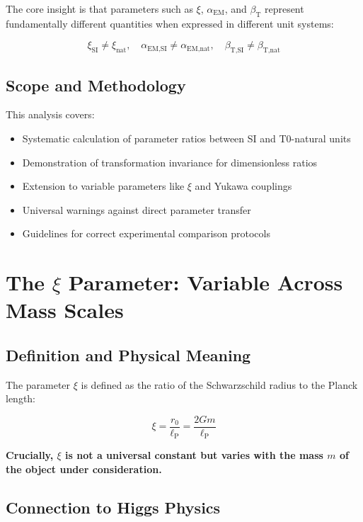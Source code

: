 \documentclass[12pt,a4paper]{article}
\newcommand{\xipar}{\xi}
\newcommand{\lP}{\ell_{\text{P}}}
\newcommand{\alphaEMSI}{\alpha_{\text{EM,SI}}}
\newcommand{\alphaEMnat}{\alpha_{\text{EM,nat}}}
\newcommand{\betaTSI}{\beta_{\text{T,SI}}}
\newcommand{\betaTnat}{\beta_{\text{T,nat}}}
\begin{document}
	The core insight is that parameters such as $\xipar$, $\alpha_{\text{EM}}$, and $\beta_{\text{T}}$ represent fundamentally different quantities when expressed in different unit systems:
	
	$$\xipar_{\text{SI}} \neq \xipar_{\text{nat}}, \quad \alphaEMSI \neq \alphaEMnat, \quad \betaTSI \neq \betaTnat$$
	
	\subsection{Scope and Methodology}
	\label{subsec:scope}
	
	This analysis covers:
	\begin{itemize}
		\item Systematic calculation of parameter ratios between SI and T0-natural units
		\item Demonstration of transformation invariance for dimensionless ratios
		\item Extension to variable parameters like $\xipar$ and Yukawa couplings
		\item Universal warnings against direct parameter transfer
		\item Guidelines for correct experimental comparison protocols
	\end{itemize}
	
	\section{The $\xipar$ Parameter: Variable Across Mass Scales}
	\label{sec:xi_parameter}
	
	\subsection{Definition and Physical Meaning}
	\label{subsec:xi_definition}
	
	The parameter $\xipar$ is defined as the ratio of the Schwarzschild radius to the Planck length:
	
	\begin{equation}
		\xipar = \frac{r_0}{\lP} = \frac{2Gm}{\lP}
		\label{eq:xi_definition}
	\end{equation}
	
	\textbf{Crucially, $\xipar$ is not a universal constant but varies with the mass $m$ of the object under consideration.}
	
	\subsection{Connection to Higgs Physics}
	\label{subsec:xi_higgs_connection}
	
\end{document}
